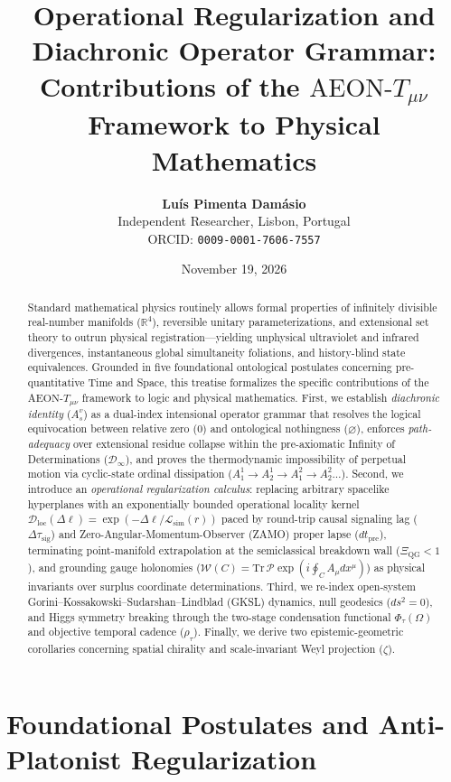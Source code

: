 \documentclass[11pt,a4paper]{article}
\title{\textbf{Operational Regularization and Diachronic Operator Grammar:\\
Contributions of the $\text{AEON-}T_{\mu\nu}$ Framework to Physical Mathematics}}
\author{
    \textbf{Luís Pimenta Damásio}\\
    \small Independent Researcher, Lisbon, Portugal\\
    \small ORCID: \texttt{0009-0001-7606-7557}
}
\date{November 19, 2026}
\begin{document}
\maketitle

\begin{abstract}
Standard mathematical physics routinely allows formal properties of infinitely divisible real-number manifolds ($\mathbb{R}^4$), reversible unitary parameterizations, and extensional set theory to outrun physical registration---yielding unphysical ultraviolet and infrared divergences, instantaneous global simultaneity foliations, and history-blind state equivalences. Grounded in five foundational ontological postulates concerning pre-quantitative Time and Space, this treatise formalizes the specific contributions of the $\text{AEON-}T_{\mu\nu}$ framework to logic and physical mathematics. First, we establish \emph{diachronic identity} ($A_s^v$) as a dual-index intensional operator grammar that resolves the logical equivocation between relative zero ($0$) and ontological nothingness ($\varnothing$), enforces \emph{path-adequacy} over extensional residue collapse within the pre-axiomatic Infinity of Determinations ($\mathcal{D}_\infty$), and proves the thermodynamic impossibility of perpetual motion via cyclic-state ordinal dissipation ($A_1^1 \to A_2^1 \to A_1^2 \to A_2^2 \dots$). Second, we introduce an \emph{operational regularization calculus}: replacing arbitrary spacelike hyperplanes with an exponentially bounded operational locality kernel $\mathcal{D}_{\mathrm{loc}}(\Delta\ell) = \exp(-\Delta\ell / \mathcal{L}_{\mathrm{sim}}(r))$ paced by round-trip causal signaling lag ($\Delta\tau_{\mathrm{sig}}$) and Zero-Angular-Momentum-Observer (ZAMO) proper lapse ($dt_{\mathrm{pre}}$), terminating point-manifold extrapolation at the semiclassical breakdown wall ($\Xi_{\mathrm{QG}} < 1$), and grounding gauge holonomies ($\mathcal{W}(C) = \mathrm{Tr}\,\mathcal{P}\exp(i \oint_C A_\mu dx^\mu)$) as physical invariants over surplus coordinate determinations. Third, we re-index open-system Gorini--Kossakowski--Sudarshan--Lindblad (GKSL) dynamics, null geodesics ($ds^2 = 0$), and Higgs symmetry breaking through the two-stage condensation functional $\Phi_\tau(\Omega)$ and objective temporal cadence ($\rho_\tau$). Finally, we derive two epistemic-geometric corollaries concerning spatial chirality and scale-invariant Weyl projection ($\zeta$).
\end{abstract}

\section{Foundational Postulates and Anti-Platonist Regularization}
\end{document}
